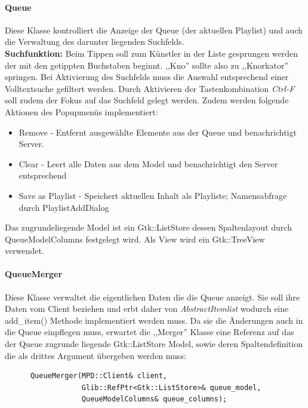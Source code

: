 \paragraph{Queue}
Diese Klasse kontrolliert die Anzeige der Queue (der aktuellen Playlist) und auch die Verwaltung des darunter liegenden Suchfelds.
\\
\textbf{Suchfunktion:} Beim Tippen soll zum Künstler in der Liste gesprungen werden der mit den getippten Buchstaben beginnt.
,,Kno'' sollte also zu ,,Knorkator'' springen. Bei Aktivierung des Suchfelds muss die Auswahl entsprechend einer Volltextsuche gefiltert werden. Durch Aktivieren der Tastenkombination \textit{Ctrl-F} soll zudem der Fokus auf das Suchfeld gelegt werden.
Zudem werden folgende Aktionen des Popupmenüs implementiert:
\begin{itemize}
\item Remove - Entfernt ausgewählte Elemente aus der Queue und benachrichtigt Server.
\item Clear - Leert alle Daten aus dem Model und benachrichtigt den Server entsprechend
\item Save as Playlist - Speichert aktuellen Inhalt als Playliste; Namensabfrage durch PlaylistAddDialog
\end{itemize}

Das zugrundeliegende Model ist ein Gtk::ListStore dessen Spaltenlayout durch QueueModelColumns festgelegt wird.
Als View wird ein Gtk::TreeView verwendet.

\paragraph{QueueMerger}
Diese Klasse verwaltet die eigentlichen Daten die die Queue anzeigt.
Sie soll ihre Daten vom Client beziehen und erbt daher von \emph{AbstractItemlist} wodurch 
eine add\_item() Methode implementiert werden muss. Da sie die Änderungen auch in die Queue einpflegen muss, erwartet die ,,Merger'' Klasse eine Referenz auf das der Queue zugrunde liegende Gtk::ListStore Model, sowie deren Spaltendefinition die als drittes Argument übergeben werden muss:
\begin{verbatim}         
      QueueMerger(MPD::Client& client,
                  Glib::RefPtr<Gtk::ListStore>& queue_model,
                  QueueModelColumns& queue_columns);
\end{verbatim}

